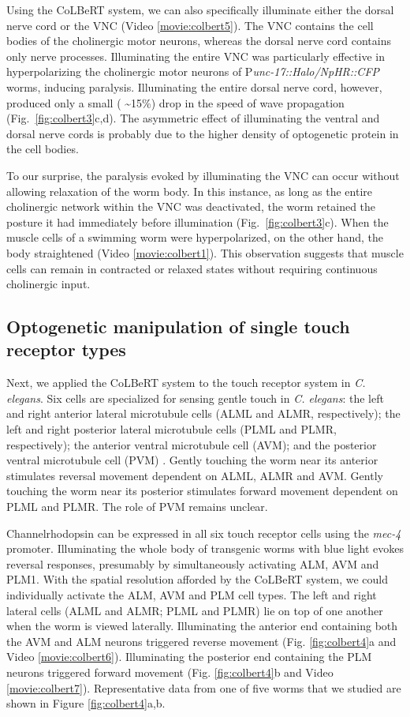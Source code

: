 Using the CoLBeRT system, we can also specifically illuminate either the dorsal nerve cord or the VNC (Video \ref{movie:colbert5}). The VNC contains the cell bodies of the cholinergic motor neurons, whereas the dorsal nerve cord contains only nerve processes. Illuminating the entire VNC was particularly effective in hyperpolarizing the cholinergic motor neurons of P\textit{unc-17::Halo/NpHR::CFP} worms, inducing paralysis. Illuminating the entire dorsal nerve cord, however, produced only a small ( \textasciitilde15\%) drop in the speed of wave propagation (Fig.~\ref{fig:colbert3}c,d). The asymmetric effect of illuminating the ventral and dorsal nerve cords is probably due to the higher density of optogenetic protein in the cell bodies.

To our surprise, the paralysis evoked by illuminating the VNC can occur without allowing relaxation of the worm body. In this instance, as long as the entire cholinergic network within the VNC was deactivated, the worm retained the posture it had immediately before illumination (Fig.~\ref{fig:colbert3}c). When the muscle cells of a swimming worm were hyperpolarized, on the other hand, the body straightened (Video \ref{movie:colbert1}). This observation suggests that muscle cells can remain in contracted or relaxed states without requiring continuous cholinergic input.


\subsection{Optogenetic manipulation of single touch receptor types}
Next, we applied the CoLBeRT system to the touch receptor system in \textit{C. elegans}. Six cells are specialized for sensing gentle touch in \textit{C. elegans}: the left and right anterior lateral microtubule cells (ALML and ALMR, respectively); the left and right posterior lateral microtubule cells (PLML and PLMR, respectively); the anterior ventral microtubule cell (AVM); and the posterior ventral microtubule cell (PVM) \citep{chalfie_neural_1985}. Gently touching the worm near its anterior stimulates reversal movement dependent on ALML, ALMR and AVM. Gently touching the worm near its posterior stimulates forward movement dependent on PLML and PLMR. The role of PVM remains unclear.

Channelrhodopsin can be expressed in all six touch receptor cells using the \textit{mec-4} promoter. Illuminating the whole body of transgenic worms with blue light evokes reversal responses, presumably by simultaneously activating ALM, AVM and PLM1. With the spatial resolution afforded by the CoLBeRT system, we could individually activate the ALM, AVM and PLM cell types. The left and right lateral cells (ALML and ALMR; PLML and PLMR) lie on top of one another when the worm is viewed laterally. Illuminating the anterior end containing both the AVM and ALM neurons triggered reverse movement (Fig. \ref{fig:colbert4}a and Video \ref{movie:colbert6}). Illuminating the posterior end containing the PLM neurons triggered forward movement (Fig. \ref{fig:colbert4}b and Video \ref{movie:colbert7}). Representative data from one of five worms that we studied are shown in Figure \ref{fig:colbert4}a,b.


